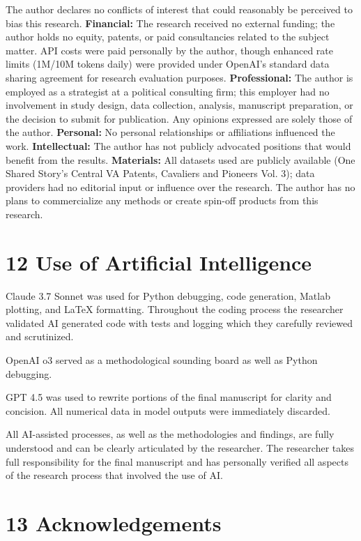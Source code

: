 \documentclass[
  10pt,
  twocolumn]{article}
\begin{document}
The author declares no conflicts of interest that could reasonably be
perceived to bias this research. \textbf{Financial:} The research
received no external funding; the author holds no equity, patents, or
paid consultancies related to the subject matter. API costs were paid
personally by the author, though enhanced rate limits (1M/10M tokens
daily) were provided under OpenAI's standard data sharing agreement for
research evaluation purposes. \textbf{Professional:} The author is
employed as a strategist at a political consulting firm; this employer
had no involvement in study design, data collection, analysis,
manuscript preparation, or the decision to submit for publication. Any
opinions expressed are solely those of the author. \textbf{Personal:} No
personal relationships or affiliations influenced the work.
\textbf{Intellectual:} The author has not publicly advocated positions
that would benefit from the results. \textbf{Materials:} All datasets
used are publicly available (One Shared Story's Central VA Patents,
Cavaliers and Pioneers Vol. 3); data providers had no editorial input or
influence over the research. The author has no plans to commercialize
any methods or create spin-off products from this research.

\section{12 Use of Artificial
Intelligence}\label{use-of-artificial-intelligence}

Claude 3.7 Sonnet was used for Python debugging, code generation, Matlab
plotting, and LaTeX formatting. Throughout the coding process the
researcher validated AI generated code with tests and logging which they
carefully reviewed and scrutinized.

OpenAI o3 served as a methodological sounding board as well as Python
debugging.

GPT 4.5 was used to rewrite portions of the final manuscript for clarity
and concision. All numerical data in model outputs were immediately
discarded.

All AI-assisted processes, as well as the methodologies and findings,
are fully understood and can be clearly articulated by the researcher.
The researcher takes full responsibility for the final manuscript and
has personally verified all aspects of the research process that
involved the use of AI.

\section{13 Acknowledgements}\label{acknowledgements}
\end{document}
